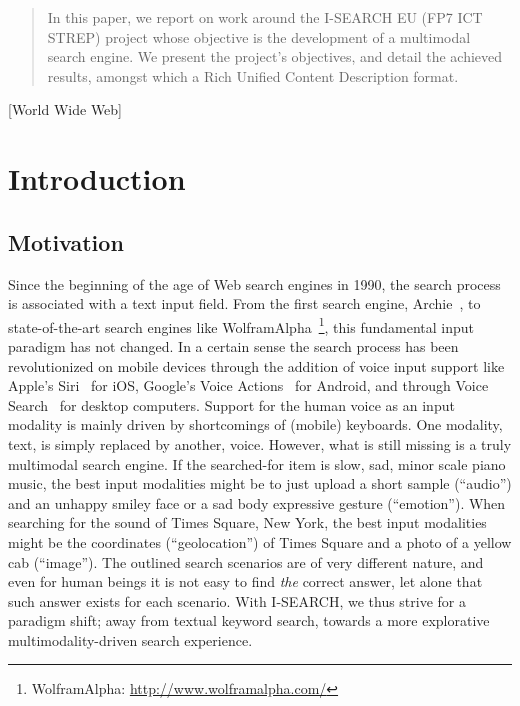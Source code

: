 \documentclass{www2012-comp-accepted}
\let\oldemph\emph
\renewcommand{\emph}[1]{\oldemph{\fontsize{9}{9}\selectfont #1}}
\newcommand{\inlinelistingsize}{\fontsize{8pt}{11pt}}
\let\oldurl\url
\renewcommand{\url}[1]{\inlinelistingsize\oldurl{#1}}
\begin{document}
\begin{abstract}
In this paper, we report on work around the \mbox{I-SEARCH} EU (FP7 ICT STREP) project whose objective is the development of a multimodal search engine.
We present the project's objectives, and detail the achieved results, amongst which a Rich Unified Content Description format. 
\end{abstract}

[World Wide Web]


\section{Introduction}
\subsection{Motivation}
Since the beginning of the age of Web search engines in 1990, the search process is associated with a text input field.
From the first search engine, Archie~\cite{archie}, to state-of-the-art search engines like WolframAlpha~\footnote{WolframAlpha: \url{http://www.wolframalpha.com/}}, this fundamental input paradigm has not changed.
In a certain sense the search process has been revolutionized on mobile devices through the addition of voice input support like Apple's Siri~\cite{siri} for iOS, Google's Voice Actions~\cite{voiceactions} for Android, and through Voice Search~\cite{voicesearch} for desktop computers.
Support for the human voice as an input modality is mainly driven by shortcomings of (mobile) keyboards.
One modality, text, is simply replaced by another, voice.
However, what is still missing is a truly multimodal search engine.
If the searched-for item is slow, sad, minor scale piano music,
the best input modalities might be to just upload a short
sample (``audio'') and an unhappy smiley face or a sad body expressive gesture (``emotion'').
When searching for the sound of Times Square, New York,
the best input modalities might be the coordinates (``geolocation'') of Times Square and a photo of a yellow cab (``image'').
The outlined search scenarios are of very different nature, and even for human beings it is not easy to find \emph{the} correct answer, let alone that such answer exists for each scenario.
With \mbox{I-SEARCH}, we thus strive for a paradigm shift; away from textual keyword search, towards a more explorative multimodality-driven search experience.
\end{document}
